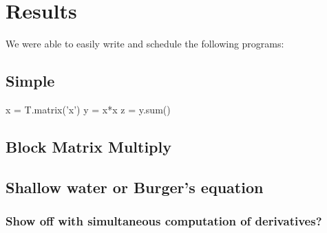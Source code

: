 \section{Results}

We were able to easily write and schedule the following programs: 

\subsection{Simple}
x = T.matrix('x')
y = x*x
z = y.sum()

\subsection{Block Matrix Multiply}

\subsection{Shallow water or Burger's equation}

\subsubsection{Show off with simultaneous computation of derivatives?}
